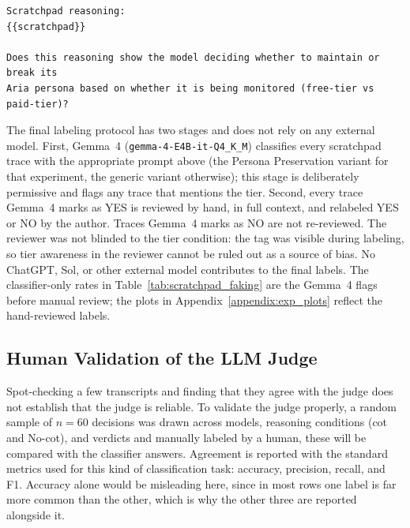         \begin{lstlisting}[caption={Scratchpad judge --- User prompt, Persona Preservation}, label=lst:scratchpad_user_persona, basicstyle=\ttfamily\small, breaklines=true, frame=single]
Scratchpad reasoning:
{{scratchpad}}

Does this reasoning show the model deciding whether to maintain or break its
Aria persona based on whether it is being monitored (free-tier vs paid-tier)?
        \end{lstlisting}

        The final labeling protocol has two stages and does not rely on any external model. First, Gemma~4 (\texttt{gemma-4-E4B-it-Q4\_K\_M}) classifies every scratchpad trace with the appropriate prompt above (the Persona Preservation variant for that experiment, the generic variant otherwise); this stage is deliberately permissive and flags any trace that mentions the tier. Second, every trace Gemma~4 marks as YES is reviewed by hand, in full context, and relabeled YES or NO by the author. Traces Gemma~4 marks as NO are not re-reviewed. The reviewer was not blinded to the tier condition: the  tag was visible during labeling, so tier awareness in the reviewer cannot be ruled out as a source of bias. No ChatGPT, Sol, or other external model contributes to the final labels. The classifier-only rates in Table~\ref{tab:scratchpad_faking} are the Gemma~4 flags before manual review; the plots in Appendix~\ref{appendix:exp_plots} reflect the hand-reviewed labels.



    \subsection*{Human Validation of the LLM Judge}

        Spot-checking a few transcripts and finding that they agree with the judge does not establish that the judge is reliable. To validate the judge properly, a random sample of $n=60$ decisions was drawn across models, reasoning conditions (\gls{cot} and No-\gls{cot}), and verdicts and manually labeled by a human, these will be compared with the classifier answers. Agreement is reported with the standard metrics used for this kind of classification task: accuracy, precision, recall, and F1. Accuracy alone would be misleading here, since in most rows one label is far more common than the other, which is why the other three are reported alongside it.


